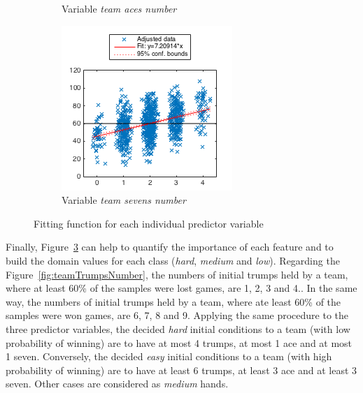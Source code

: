\begin{figure}[h]
\begin{subfigure}[h]{0.32\textwidth}
                \caption{Variable \emph{team aces number}}
                \label{fig:teamAcesNumber}
        \end{subfigure}
        \begin{subfigure}[h]{0.32\textwidth}
                \includegraphics[width=\textwidth]{./img/5/teamSevensNumber}
                \caption{Variable \emph{team sevens number}}
                \label{fig:teamSevensNumber}
        \end{subfigure}
        \caption{Fitting function for each individual predictor variable}
        \label{fig:fitFunctions}
\end{figure}

Finally, Figure~\ref{fig:fitFunctions} can help to quantify the importance of each feature and to build the domain values for each class (\emph{hard}, \emph{medium} and \emph{low}).
Regarding the Figure~\ref{fig:teamTrumpsNumber}, the numbers of initial trumps held by a team, where at least 60\% of the samples were lost games, are 1, 2, 3 and 4..
In the same way, the numbers of initial trumps held by a team, where ate least 60\% of the samples were won games, are 6, 7, 8 and 9.
Applying the same procedure to the three predictor variables, the decided \emph{hard} initial conditions to a team (with low probability of winning) are to have at most 4 trumps, at most 1 ace and at most 1 seven.
Conversely, the decided \emph{easy} initial conditions to a team (with high probability of winning) are to have at least 6 trumps, at least 3 ace and at least 3 seven.
Other cases are considered as \emph{medium} hands.


